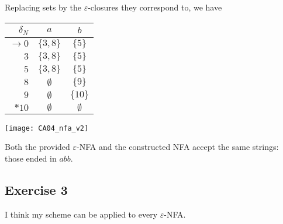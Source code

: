 Replacing sets by the $\varepsilon$-closures they correspond to, we have
\begin{center}
\begin{tabular}{ r | c c }
 $\delta_N$ & $a$ & $b$ \\ \hline
 $\rightarrow  0 $ & $\{3,8\}  $ & $\{5\}    $\\%
 $             3 $ & $\{3,8\}  $ & $\{5\}    $\\%
 $             5 $ & $\{3,8\}  $ & $\{5\}    $\\%
 $             8 $ & $\emptyset$ & $\{9\}    $\\%
 $             9 $ & $\emptyset$ & $\{10\}   $\\%
 $        \ast 10$ & $\emptyset$ & $\emptyset$  %
\end{tabular}
\end{center}
\begin{center} \texttt{[image: CA04\_nfa\_v2]} \end{center}
Both the provided $\varepsilon$-NFA and the constructed NFA accept the same strings: those ended in $abb$.
\subsection{Exercise 3}
I think my scheme can be applied to every $\varepsilon$-NFA.
